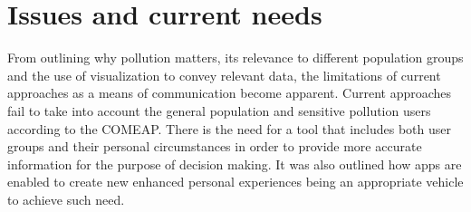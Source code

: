 \section{Issues and current needs}
From outlining why pollution matters, its relevance to different population groups and the use of visualization to convey relevant data, the limitations of current approaches as a means of communication become apparent. Current approaches fail to take into account the general population and sensitive pollution users according to the COMEAP. There is the need for a tool that includes both user groups and their personal circumstances in order to provide more accurate information for the purpose of decision making. It was also outlined how apps are enabled to create new enhanced personal experiences being an appropriate vehicle to achieve such need.
